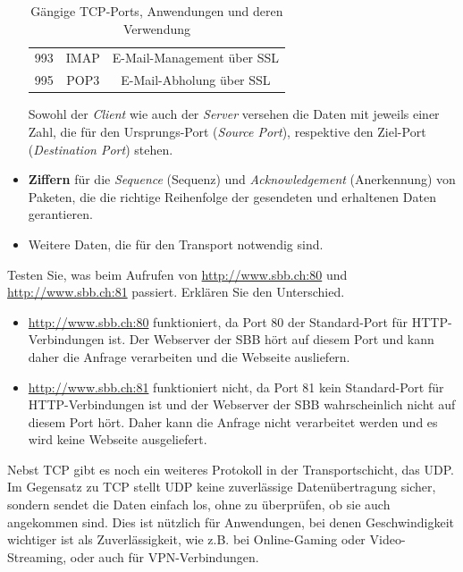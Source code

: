 \begin{itemize}
\begin{table}[H]
\begin{tabular}{c||c|c}
			      993           & \acrfull{IMAP}     & E-Mail-Management über \acrshort{SSL} \\
			      995           & \acrfull{POP3}     & E-Mail-Abholung über \acrshort{SSL}   \\
			      \bottomrule
		      \end{tabular}
		      \caption{Gängige \gls{TCP}-Ports, Anwendungen und deren Verwendung}
		      \label{tab:tcpPorts}
	      \end{table}
	      Sowohl der \textit{Client} wie auch der \textit{Server} versehen die Daten mit jeweils einer Zahl, die für den Ursprungs-Port (\textit{Source Port}), respektive den Ziel-Port (\textit{Destination Port}) stehen.
	\item \textbf{Ziffern} für die \textit{Sequence} (Sequenz) und \textit{Acknowledgement} (Anerkennung) von Paketen, die die richtige Reihenfolge der gesendeten und erhaltenen Daten gerantieren.
	\item Weitere Daten, die für den Transport notwendig sind.
\end{itemize}

\begin{myexercise}
	Testen Sie, was beim Aufrufen von \url{http://www.sbb.ch:80} und \url{http://www.sbb.ch:81} passiert. Erklären Sie den Unterschied.
	\begin{myanswer}
		\begin{itemize}
			\item \url{http://www.sbb.ch:80} funktioniert, da Port 80 der Standard-Port für HTTP-Verbindungen ist. Der Webserver der SBB hört auf diesem Port und kann daher die Anfrage verarbeiten und die Webseite ausliefern.
			\item \url{http://www.sbb.ch:81} funktioniert nicht, da Port 81 kein Standard-Port für HTTP-Verbindungen ist und der Webserver der SBB wahrscheinlich nicht auf diesem Port hört. Daher kann die Anfrage nicht verarbeitet werden und es wird keine Webseite ausgeliefert.
		\end{itemize}
	\end{myanswer}
\end{myexercise}

Nebst \gls{TCP} gibt es noch ein weiteres Protokoll in der Transportschicht, das \gls{UDP}. Im Gegensatz zu \gls{TCP} stellt \gls{UDP} keine zuverlässige Datenübertragung sicher, sondern sendet die Daten einfach los, ohne zu überprüfen, ob sie auch angekommen sind. Dies ist nützlich für Anwendungen, bei denen Geschwindigkeit wichtiger ist als Zuverlässigkeit, wie z.B. bei Online-Gaming oder Video-Streaming, oder auch für \gls{VPN}-Verbindungen.

